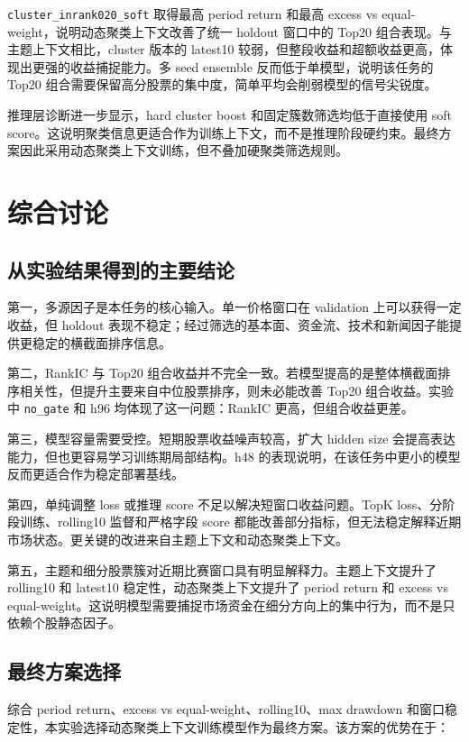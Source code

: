 \documentclass[UTF8,a4paper,12pt,fontset=none]{ctexart}
\begin{document}
\texttt{cluster\_inrank020\_soft} 取得最高 period return 和最高 excess vs equal-weight，说明动态聚类上下文改善了统一 holdout 窗口中的 Top20 组合表现。与主题上下文相比，cluster 版本的 latest10 较弱，但整段收益和超额收益更高，体现出更强的收益捕捉能力。多 seed ensemble 反而低于单模型，说明该任务的 Top20 组合需要保留高分股票的集中度，简单平均会削弱模型的信号尖锐度。

推理层诊断进一步显示，hard cluster boost 和固定簇数筛选均低于直接使用 soft score。这说明聚类信息更适合作为训练上下文，而不是推理阶段硬约束。最终方案因此采用动态聚类上下文训练，但不叠加硬聚类筛选规则。

\section{综合讨论}

\subsection{从实验结果得到的主要结论}

第一，多源因子是本任务的核心输入。单一价格窗口在 validation 上可以获得一定收益，但 holdout 表现不稳定；经过筛选的基本面、资金流、技术和新闻因子能提供更稳定的横截面排序信息。

第二，RankIC 与 Top20 组合收益并不完全一致。若模型提高的是整体横截面排序相关性，但提升主要来自中位股票排序，则未必能改善 Top20 组合收益。实验中 \texttt{no\_gate} 和 h96 均体现了这一问题：RankIC 更高，但组合收益更差。

第三，模型容量需要受控。短期股票收益噪声较高，扩大 hidden size 会提高表达能力，但也更容易学习训练期局部结构。h48 的表现说明，在该任务中更小的模型反而更适合作为稳定部署基线。

第四，单纯调整 loss 或推理 score 不足以解决短窗口收益问题。TopK loss、分阶段训练、rolling10 监督和严格字段 score 都能改善部分指标，但无法稳定解释近期市场状态。更关键的改进来自主题上下文和动态聚类上下文。

第五，主题和细分股票簇对近期比赛窗口具有明显解释力。主题上下文提升了 rolling10 和 latest10 稳定性，动态聚类上下文提升了 period return 和 excess vs equal-weight。这说明模型需要捕捉市场资金在细分方向上的集中行为，而不是只依赖个股静态因子。

\subsection{最终方案选择}

综合 period return、excess vs equal-weight、rolling10、max drawdown 和窗口稳定性，本实验选择动态聚类上下文训练模型作为最终方案。该方案的优势在于：
\end{document}
